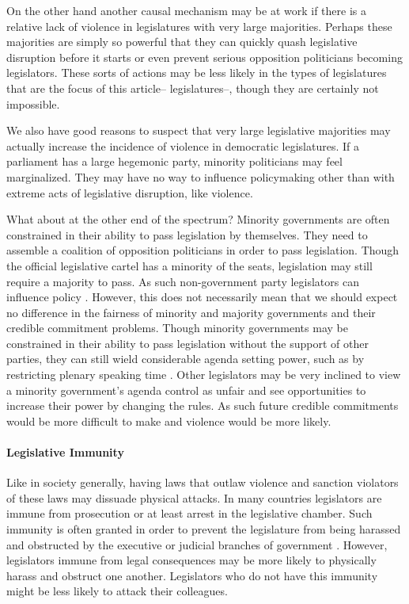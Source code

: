 \documentclass[a4paper]{article}\usepackage[]{graphicx}\usepackage[]{color}
\begin{document}
On the other hand another causal mechanism may be at work if there is a relative lack of violence in legislatures with very large majorities. Perhaps these majorities are simply so powerful that they can quickly quash legislative disruption before it starts or even prevent serious opposition politicians becoming legislators. These sorts of actions may be less likely in the types of legislatures that are the focus of this article-- legislatures--, though they are certainly not impossible.

We also have good reasons to suspect that very large legislative majorities may actually increase the incidence of violence in democratic legislatures. If a parliament has a large hegemonic party, minority politicians may feel marginalized. They may have no way to influence policymaking other than with extreme acts of legislative disruption, like violence.

What about at the other end of the spectrum? Minority governments are often constrained in their ability to pass legislation by themselves. They need to assemble a coalition of opposition politicians in order to pass legislation. Though the official legislative cartel has a minority of the seats, legislation may still require a majority to pass. As such non-government party legislators can influence policy \citep{strom1990minority}. However, this does not necessarily mean that we should expect no difference in the fairness of minority and majority governments and their credible commitment problems. Though minority governments may be constrained in their ability to pass legislation without the support of other parties, they can still wield considerable agenda setting power, such as by restricting plenary speaking time \citep{Tsebelis2002,cox2005,cox2007}. Other legislators may be very inclined to view a minority government's agenda control as unfair and see opportunities to increase their power by changing the rules. As such future credible commitments would be more difficult to make and violence would be more likely.

\paragraph{Legislative Immunity}

Like in society generally, having laws that outlaw violence and sanction violators of these laws may dissuade physical attacks. In many countries legislators are immune from prosecution or at least arrest in the legislative chamber. Such immunity is often granted in order to prevent the legislature from being harassed and obstructed by the executive or judicial branches of government  \citep{Seghetti1984}. However, legislators immune from legal consequences may be more likely to physically harass and obstruct one another. Legislators who do not have this immunity might be less likely to attack their colleagues.
\end{document}
